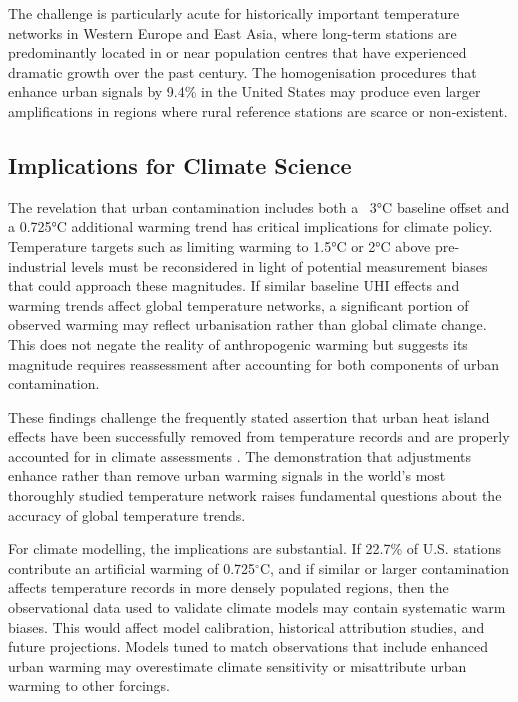 \documentclass[11pt, a4paper]{article}
\begin{document}
The challenge is particularly acute for historically important temperature networks in Western Europe and East Asia, where long-term stations are predominantly located in or near population centres that have experienced dramatic growth over the past century. The homogenisation procedures that enhance urban signals by 9.4\% in the United States may produce even larger amplifications in regions where rural reference stations are scarce or non-existent.

\subsection{Implications for Climate Science}

The revelation that urban contamination includes both a ~3°C baseline offset and a 0.725°C additional warming trend has critical implications for climate policy. Temperature targets such as limiting warming to 1.5°C or 2°C above pre-industrial levels must be reconsidered in light of potential measurement biases that could approach these magnitudes. If similar baseline UHI effects and warming trends affect global temperature networks, a significant portion of observed warming may reflect urbanisation rather than global climate change. This does not negate the reality of anthropogenic warming but suggests its magnitude requires reassessment after accounting for both components of urban contamination.

These findings challenge the frequently stated assertion that urban heat island effects have been successfully removed from temperature records and are properly accounted for in climate assessments \parencite{ipcc2021physical}. The demonstration that adjustments enhance rather than remove urban warming signals in the world's most thoroughly studied temperature network raises fundamental questions about the accuracy of global temperature trends.

For climate modelling, the implications are substantial. If 22.7\% of U.S. stations contribute an artificial warming of 0.725$^\circ$C, and if similar or larger contamination affects temperature records in more densely populated regions, then the observational data used to validate climate models may contain systematic warm biases. This would affect model calibration, historical attribution studies, and future projections. Models tuned to match observations that include enhanced urban warming may overestimate climate sensitivity or misattribute urban warming to other forcings.
\end{document}
